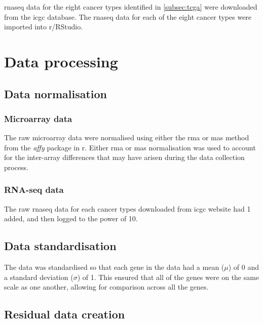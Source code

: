 \gls{rnaseq} data for the eight cancer types identified in \cref{subsec:tcga} were downloaded from the \gls{icgc} database.
The \gls{rnaseq} data for each of the eight cancer types were imported into \gls{r}/RStudio.





\section{Data processing}
\label{sec:datproc}

\subsection{Data normalisation}
\label{sub:data_normalisation}

\subsubsection{Microarray data}
\label{ssub:microarray_data}

The raw microarray data were normalised using either the \gls{rma} or \gls{mas} method from the \textit{affy} package in \gls{r}.
Either \gls{rma} or \gls{mas} normalisation was used to account for the inter-array differences that may have arisen during the data collection process.

\subsubsection{RNA-seq data}
\label{ssub:rna_seq_data}

The raw \gls{rnaseq} data for each cancer types downloaded from \gls{icgc} website had 1 added, and then logged to the power of 10.

\subsection{Data standardisation}
\label{sub:data_standardisation}

The data was standardised so that each gene in the data had a mean ($\mu$) of 0 and a standard deviation ($\sigma$) of 1.
This ensured that all of the genes were on the same scale as one another, allowing for comparison across all the genes.

\subsection{Residual data creation}
\label{sub:residual_data_creation}

